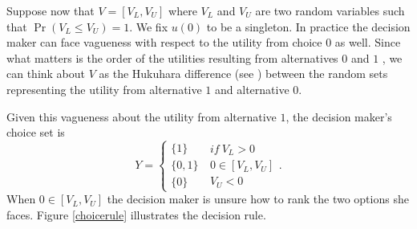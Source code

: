 \documentclass{article}
\renewcommand{\cite}{\citet}
\begin{document}
Suppose now that $V=[V_{L},V_{U}]$ where $V_{L}$ and $V_{U}$ are two random
variables such that $\Pr \left( V_{L}\leq V_{U}\right) =1$. We fix $u\left(
0\right) $ to be a singleton. In practice the decision maker can face
vagueness with respect to the utility from choice $0$ as well. Since what
matters is the order of the utilities resulting from alternatives $0$ and $1$%
, we can think about $V$ as the Hukuhara difference (see \cite{Hukuhara1967}%
) between the random sets representing the utility from alternative $1$ and
alternative $0$.

Given this vagueness about the utility from alternative $1$, the decision
maker's choice set is%
\begin{equation*}
Y=\left\{ 
\begin{array}{c}
\{1\} \\ 
\{0,1\} \\ 
\{0\}%
\end{array}%
\ 
\begin{array}{c}
if\ V_{L}>0 \\ 
0\in \left[ V_{L},V_{U}\right] \\ 
V_{U}<0%
\end{array}%
\right. .
\end{equation*}%
When $0\in \left[ V_{L},V_{U}\right] $ the decision maker is unsure how to
rank the two options she faces. Figure \ref{choicerule} illustrates the
decision rule.
\end{document}
